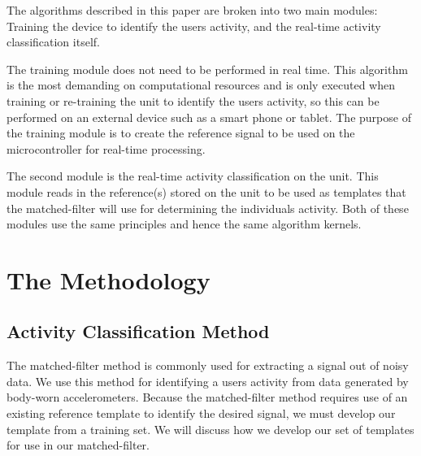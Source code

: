 \documentclass[journal]{IEEEtran}
\begin{document}
The algorithms described in this paper are broken into two main modules: Training the device to identify the user\textquotesingle s activity, and the real-time activity classification itself.

The training module does not need to be performed in real time.
This algorithm is the most demanding on computational resources and is only executed when training or re-training the unit to identify the user\textquotesingle s activity, so this can be performed on an external device such as a smart phone or tablet.
The purpose of the training module is to create the reference signal to be used on the microcontroller for real-time processing.

The second module is the real-time activity classification on the unit.
This module reads in the reference(s) stored on the unit to be used as templates that the matched-filter will use for determining the individual\textquotesingle s activity.
Both of these modules use the same principles and hence the same algorithm kernels.
%
\section{The Methodology}
%
\subsection{Activity Classification Method}
The matched-filter method is commonly used for extracting a signal out of noisy data.
We use this method for identifying a user\textquotesingle s activity from data generated by body-worn accelerometers.
Because the matched-filter method requires use of an existing reference template to identify the desired signal, we must develop our template from a training set.
We will discuss how we develop our set of templates for use in our matched-filter.
\end{document}
